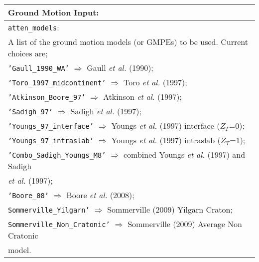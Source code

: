 \documentclass[a4paper, 12pt]{report}
\begin{document}
\vspace{2em}
\begin{tabular}{|p{\textwidth}|}
\hline
\vspace{0.3em} \noindent \Large \textbf{Ground Motion Input:} \normalsize \\
\hline \vspace{0.1em} \texttt{atten\_models}: \\
A list of the ground motion models (or GMPEs) to be used. Current choices are; \\
 \hspace{0.5em} \texttt{'Gaull\_1990\_WA'} $\Rightarrow$ Gaull \textit{et al.} (1990); \\
 \hspace{0.5em}  \texttt{'Toro\_1997\_midcontinent'}  $\Rightarrow$ Toro \textit{et al.} (1997); \\
 \hspace{0.5em}  \texttt{'Atkinson\_Boore\_97'}  $\Rightarrow$ Atkinson \textit{et al.} (1997); \\
 \hspace{0.5em}  \texttt{'Sadigh\_97'}  $\Rightarrow$ Sadigh \textit{et al.} (1997); \\
 \hspace{0.5em}  \texttt{'Youngs\_97\_interface'}  $\Rightarrow$ Youngs \textit{et al.} (1997) interface ($Z_T$=0); \\
 \hspace{0.5em}  \texttt{'Youngs\_97\_intraslab'}  $\Rightarrow$ Youngs \textit{et al.} (1997) intraslab ($Z_T$=1); \\
 \hspace{0.5em}  \texttt{'Combo\_Sadigh\_Youngs\_M8'}  $\Rightarrow$ combined Youngs \textit{et al.} (1997) and Sadigh \\
 \hspace{14.5em} \textit{et al.} (1997); \\
 \hspace{0.5em}  \texttt{'Boore\_08'}  $\Rightarrow$ Boore \textit{et al.} (2008); \\
 \hspace{0.5em} \texttt{Sommerville\_Yilgarn'} $\Rightarrow$ Sommerville (2009) Yilgarn Craton; \\
  \hspace{0.5em} \texttt{Sommerville\_Non\_Cratonic'} $\Rightarrow$ Sommerville (2009) Average Non Cratonic \\
  \hspace{14.5em}  model. \\

\end{tabular}
\end{document}
